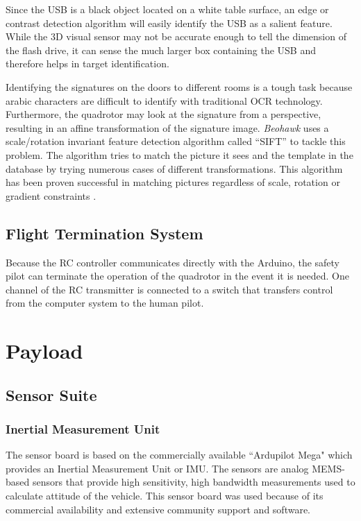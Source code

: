 \documentclass[12pt, letterpaper]{article}
\begin{document}
Since the USB is a black object located on a white table surface, an edge or contrast detection algorithm will easily identify the USB as a salient feature. While the 3D visual sensor may not be accurate enough to tell the dimension of the flash drive, it can sense the much larger box containing the USB and therefore helps in target identification. 

Identifying the signatures on the doors to different rooms is a tough task because arabic characters are difficult to identify with traditional OCR technology.  Furthermore, the quadrotor may look at the signature from a perspective, resulting in an affine transformation of the signature image. \textit{Beohawk} uses a scale/rotation invariant feature detection algorithm called ``SIFT'' to tackle this problem. The algorithm tries to match the picture it sees and the template in the database by trying numerous cases of different transformations. This algorithm has been proven successful in matching pictures regardless of scale, rotation or gradient constraints \cite{bib:sift}.

\subsection{Flight Termination System}
Because the RC controller communicates directly with the Arduino, the safety pilot can terminate the operation of the quadrotor in the event it is needed. One channel of the RC transmitter is connected to a switch that transfers control from the computer system to the human pilot.


\section{Payload}
\subsection{Sensor Suite}

\subsubsection{Inertial Measurement Unit}

The sensor board is based on the commercially available ``Ardupilot Mega" which provides an Inertial Measurement Unit or IMU. The sensors are analog MEMS-based sensors that provide high sensitivity, high bandwidth measurements used to calculate attitude of the vehicle. This sensor board was used because of its commercial availability and extensive community support and software.
\end{document}

